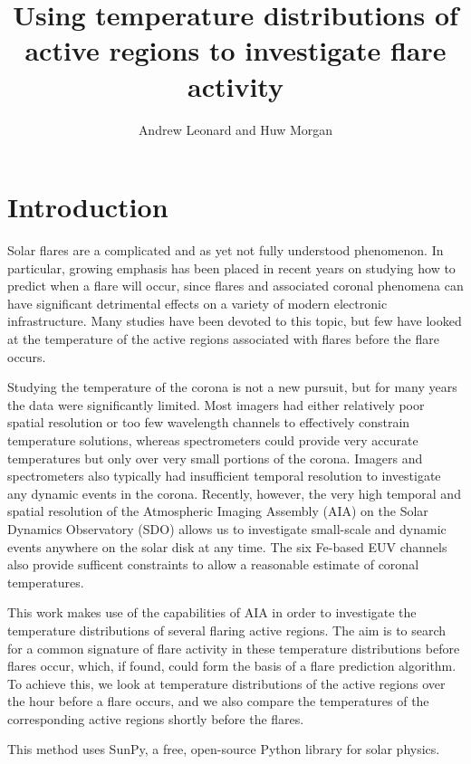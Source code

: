 \documentclass{article}
\author{Andrew Leonard and Huw Morgan}
\title{Using temperature distributions of active regions to investigate flare activity}
\begin{document}
\maketitle

\section{Introduction}
Solar flares are a complicated and as yet not fully understood phenomenon.
In particular, growing emphasis has been placed in recent years on studying how to predict when a flare will occur, since flares and associated coronal phenomena can have significant detrimental effects on a variety of modern electronic infrastructure.
Many studies have been devoted to this topic, but few have looked at the temperature of the active regions associated with flares before the flare occurs.

Studying the temperature of the corona is not a new pursuit, but for many years the data were significantly limited.
Most imagers had either relatively poor spatial resolution or too few wavelength channels to effectively constrain temperature solutions, whereas spectrometers could provide very accurate temperatures but only over very small portions of the corona.
Imagers and spectrometers also typically had insufficient temporal resolution to investigate any dynamic events in the corona.
Recently, however, the very high temporal and spatial resolution of the Atmospheric Imaging Assembly (AIA) on the Solar Dynamics Observatory (SDO) allows us to investigate small-scale and dynamic events anywhere on the solar disk at any time.
The six Fe-based EUV channels also provide sufficent constraints to allow a reasonable estimate of coronal temperatures.

This work makes use of the capabilities of AIA in order to investigate the temperature distributions of several flaring active regions.
The aim is to search for a common signature of flare activity in these temperature distributions before flares occur, which, if found, could form the basis of a flare prediction algorithm.
To achieve this, we look at temperature distributions of the active regions over the hour before a flare occurs, and we also compare the temperatures of the corresponding active regions shortly before the flares.

This method uses SunPy, a free, open-source Python library for solar physics.

\end{document}
